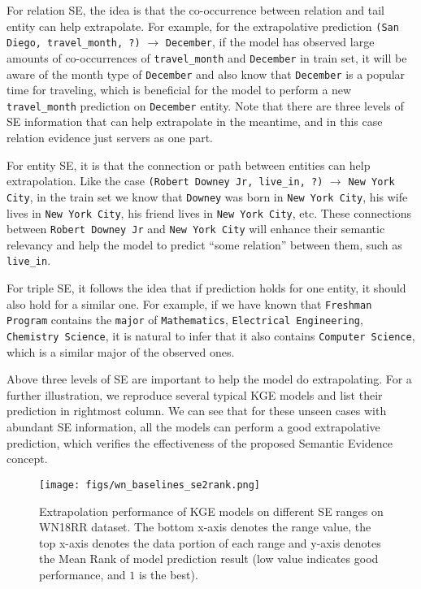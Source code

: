 \documentclass[letterpaper]{article} \usepackage{aaai22}  \usepackage{times}  \usepackage{helvet}  \usepackage{courier}  \usepackage[hyphens]{url}  \usepackage{graphicx} \urlstyle{rm} \def\UrlFont{\rm}  \usepackage{natbib}  \usepackage{caption} \DeclareCaptionStyle{ruled}{labelfont=normalfont,labelsep=colon,strut=off} \frenchspacing  \setlength{\pdfpagewidth}{8.5in}  \setlength{\pdfpageheight}{11in}  \usepackage{algorithm}
\begin{document}
For relation SE, the idea is that the co-occurrence between relation and tail entity can help extrapolate. For example, for the extrapolative prediction \texttt{(San Diego, travel\_month, ?)} $\rightarrow$ \texttt{December}, if the model has observed large amounts of co-occurrences of \texttt{travel\_month} and \texttt{December} in train set, it will be aware of the month type of \texttt{December} and also know that \texttt{December} is a popular time for traveling, which is beneficial for the model to perform a new \texttt{travel\_month} prediction on \texttt{December} entity. Note that there are three levels of SE information that can help extrapolate in the meantime, and in this case relation evidence just servers as one part. 

For entity SE, it is that the connection or path between entities can help extrapolation. Like the case \texttt{(Robert Downey Jr, live\_in, ?)} $\rightarrow$ \texttt{New York City}, in the train set we know that \texttt{Downey} was born in \texttt{New York City}, his wife lives in \texttt{New York City}, his friend lives in \texttt{New York City}, etc. These connections between \texttt{Robert Downey Jr} and \texttt{New York City} will enhance their semantic relevancy and help the model to predict ``some relation'' between them, such as \texttt{live\_in}. 

For triple SE, it follows the idea that if prediction holds for one entity, it should also hold for a similar one. For example, if we have known that \texttt{Freshman Program} contains the \texttt{major} of \texttt{Mathematics}, \texttt{Electrical Engineering}, \texttt{Chemistry Science}, it is natural to infer that it also contains \texttt{Computer Science}, which is a similar major of the observed ones. 

Above three levels of SE are important to help the model do extrapolating. For a further illustration, we reproduce several typical KGE models and list their prediction in rightmost column. We can see that for these unseen cases with abundant SE information, all the models can perform a good extrapolative prediction, which verifies the effectiveness of the proposed Semantic Evidence concept.


\begin{figure*}
    \centering 
    \texttt{[image: figs/wn\_baselines\_se2rank.png]} 
    \caption{Extrapolation performance of KGE models on different SE ranges on WN18RR dataset. The bottom x-axis denotes the range value, the top x-axis denotes the data portion of each range and y-axis denotes the Mean Rank of model prediction result (low value indicates good performance, and $1$ is the best).} 
    \label{fig: wn_baselines_se2rank}
\end{figure*}
\end{document}
